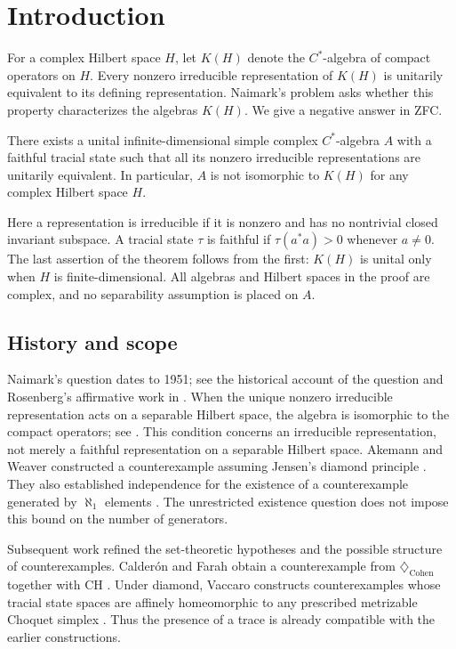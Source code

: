 \section{Introduction}
\label{sec:introduction}

For a complex Hilbert space $H$, let $K(H)$ denote the $C^*$-algebra of
compact operators on $H$. Every nonzero irreducible representation of
$K(H)$ is unitarily equivalent to its defining representation.
Naimark's problem asks whether this property characterizes the algebras
$K(H)$. We give a negative answer in ZFC.

\begin{theorem}\label{na:main}
There exists a unital infinite-dimensional simple complex $C^*$-algebra
$A$ with a faithful tracial state such that all its nonzero irreducible
representations are unitarily equivalent. In particular, $A$ is not
isomorphic to $K(H)$ for any complex Hilbert space $H$.
\end{theorem}

Here a representation is irreducible if it is nonzero and has no
nontrivial closed invariant subspace. A tracial state $\tau$ is faithful if
$\tau(a^*a)>0$ whenever $a\ne0$. The last assertion of the theorem follows
from the first: $K(H)$ is unital only when $H$ is finite-dimensional.
All algebras and Hilbert spaces in the proof are complex, and no
separability assumption is placed on $A$.

\subsection*{History and scope}
Naimark's question dates to 1951; see the historical account of the
question and Rosenberg's affirmative work in \cite{AkemannWeaver2004}.
When the unique nonzero irreducible representation acts on a separable
Hilbert space, the algebra is isomorphic to the compact operators;
see \cite[Proposition~7.2]{CalderonFarah2022}. This condition concerns
an irreducible representation, not merely a faithful representation
on a separable Hilbert space.
Akemann and Weaver constructed a counterexample
assuming Jensen's diamond principle
\cite[Theorem~5]{AkemannWeaver2004}. They also established independence
for the existence of a counterexample generated by $\aleph_1$ elements
\cite[Corollary~7]{AkemannWeaver2004}. The unrestricted existence question
does not impose this bound on the number of generators.

Subsequent work refined the set-theoretic hypotheses and the possible
structure of counterexamples. Calder\'on and Farah obtain a
counterexample from $\diamondsuit_{\mathrm{Cohen}}$ together with CH
\cite[Theorem~5.4]{CalderonFarah2022}. Under diamond, Vaccaro constructs
counterexamples whose tracial state spaces are affinely homeomorphic
to any prescribed metrizable Choquet simplex
\cite{Vaccaro2018,Vaccaro2020}. Thus the presence of a trace is already
compatible with the earlier constructions.

